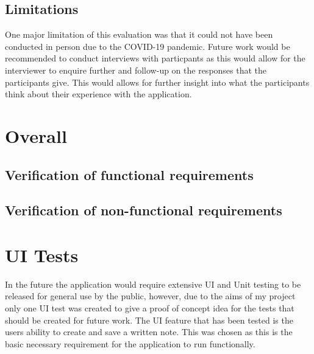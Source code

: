 \documentclass{l4proj}
\begin{document}
\subsection{Limitations}
One major limitation of this evaluation was that it could not have been conducted in person due to the COVID-19 pandemic. Future work
would be recommended to conduct interviews with particpants as this would allow for the interviewer to enquire further and follow-up
on the responses that the participants give. This would allows for further insight into what the participants think about their 
experience with the application.

\section{Overall}
\subsection{Verification of functional requirements}
\subsection{Verification of non-functional requirements}

\section{UI Tests}

In the future the application would require extensive UI and Unit testing to be released for general use by the public, however, due
to the aims of my project only one UI test was created to give a proof of concept idea for the tests that should be created for future
work. The UI feature that has been tested is the users ability to create and save a written note. This was chosen as this is the 
basic necessary requirement for the application to run functionally. 



\end{document}
